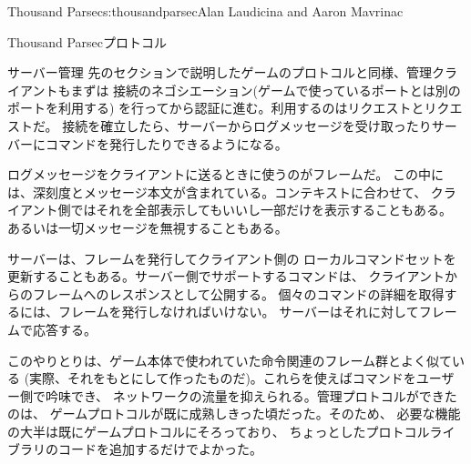 \begin{aosachapter}{Thousand Parsec}{s:thousandparsec}{Alan Laudicina and Aaron Mavrinac}
\begin{aosasect1}{Thousand Parsecプロトコル}
\begin{aosasect2}{サーバー管理}
先のセクションで説明したゲームのプロトコルと同様、管理クライアントもまずは
接続のネゴシエーション(ゲームで使っているポートとは別のポートを利用する)
を行ってから認証に進む。利用するのはリクエストとリクエストだ。
接続を確立したら、サーバーからログメッセージを受け取ったりサーバーにコマンドを発行したりできるようになる。

ログメッセージをクライアントに送るときに使うのがフレームだ。
この中には、深刻度とメッセージ本文が含まれている。コンテキストに合わせて、
クライアント側ではそれを全部表示してもいいし一部だけを表示することもある。
あるいは一切メッセージを無視することもある。

サーバーは、フレームを発行してクライアント側の
ローカルコマンドセットを更新することもある。サーバー側でサポートするコマンドは、
クライアントからのフレームへのレスポンスとして公開する。
個々のコマンドの詳細を取得するには、フレームを発行しなければいけない。
サーバーはそれに対してフレームで応答する。

このやりとりは、ゲーム本体で使われていた命令関連のフレーム群とよく似ている
(実際、それをもとにして作ったものだ)。これらを使えばコマンドをユーザー側で吟味でき、
ネットワークの流量を抑えられる。管理プロトコルができたのは、
ゲームプロトコルが既に成熟しきった頃だった。そのため、
必要な機能の大半は既にゲームプロトコルにそろっており、
ちょっとしたプロトコルライブラリのコードを追加するだけでよかった。


\end{aosasect2}
\end{aosasect1}
\end{aosachapter}
